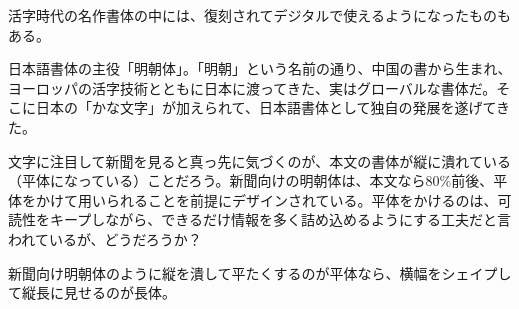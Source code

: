 活字時代の名作書体の中には、復刻されてデジタルで使えるようになったものもある\cite{mdn_201611}。

日本語書体の主役「明朝体」。「明朝」という名前の通り、中国の書から生まれ、ヨーロッパの活字技術とともに日本に渡ってきた、実はグローバルな書体だ。そこに日本の「かな文字」が加えられて、日本語書体として独自の発展を遂げてきた\cite{mdn_201611}。

文字に注目して新聞を見ると真っ先に気づくのが、本文の書体が縦に潰れている（平体になっている）ことだろう。新聞向けの明朝体は、本文なら80\%前後、平体をかけて用いられることを前提にデザインされている。平体をかけるのは、可読性をキープしながら、できるだけ情報を多く詰め込めるようにする工夫だと言われているが、どうだろうか？\cite{mdn_201611}

新聞向け明朝体のように縦を潰して平たくするのが平体なら、横幅をシェイプして縦長に見せるのが長体\cite{mdn_201611}。
